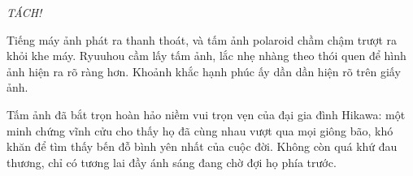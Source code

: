 ﻿\documentclass[../main.tex]{subfiles}
\begin{document}
\textit{TÁCH!}

Tiếng máy ảnh phát ra thanh thoát, và tấm ảnh polaroid chầm chậm trượt ra khỏi khe máy. Ryuuhou cầm lấy tấm ảnh, lắc nhẹ nhàng theo thói quen để hình ảnh hiện ra rõ ràng hơn. Khoảnh khắc hạnh phúc ấy dần dần hiện rõ trên giấy ảnh.

Tấm ảnh đã bắt trọn hoàn hảo niềm vui trọn vẹn của đại gia đình Hikawa: một minh chứng vĩnh cửu cho thấy họ đã cùng nhau vượt qua mọi giông bão, khó khăn để tìm thấy bến đỗ bình yên nhất của cuộc đời. Không còn quá khứ đau thương, chỉ có tương lai đầy ánh sáng đang chờ đợi họ phía trước.
\end{document}
